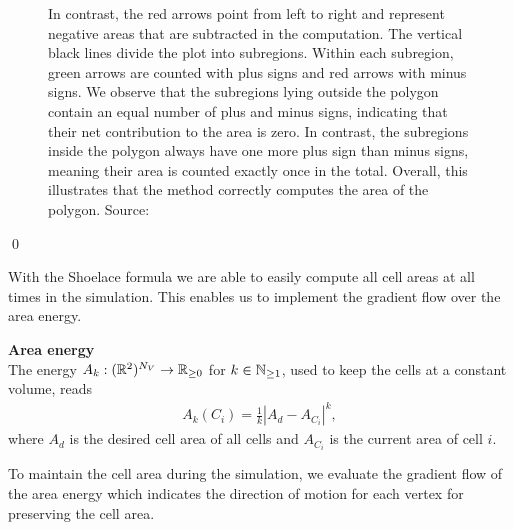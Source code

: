 \begin{proposition}
\begin{figure}
\begin{center}
{				In contrast, the red arrows point from left to right and represent negative areas that are subtracted in the computation.
				The vertical black lines divide the plot into subregions.
				Within each subregion, green arrows are counted with plus signs and red arrows with minus signs.
				We observe that the subregions lying outside the polygon contain an equal number of plus and minus signs, indicating that their net contribution to the area is zero.
				In contrast, the subregions inside the polygon always have one more plus sign than minus signs, meaning their area is counted exactly once in the total.
				Overall, this illustrates that the method correctly computes the area of the polygon.
				Source:~\cite{ShoelaceFigure2022}}
			\label{fig:shoelace}
		\end{center}
	\end{figure}
	\qed
\end{proposition}

With the Shoelace formula we are able to easily compute all cell areas at all times in the simulation. 
This enables us to implement the gradient flow over the area energy. 

\begin{definition} \textbf{Area energy} \\
The energy $A_k: (\mathbb{R}^2)^{N_V} \rightarrow \mathbb{R}_{\geq 0}$ for $k \in \mathbb{N}_{\geq 1}$, used to keep the cells at a constant volume, reads 
	\begin{align}
		A_k(C_i) = \frac{1}{k} | A_d - A_{C_i}|^k, \label{eq:areaEnergy} 
	\end{align}
	where $A_d$ is the desired cell area of all cells and $A_{C_i}$ is the current area of cell $i$. 
\end{definition}

To maintain the cell area during the simulation, we evaluate the gradient flow of the area energy which indicates the direction of motion for each vertex for preserving the cell area.

